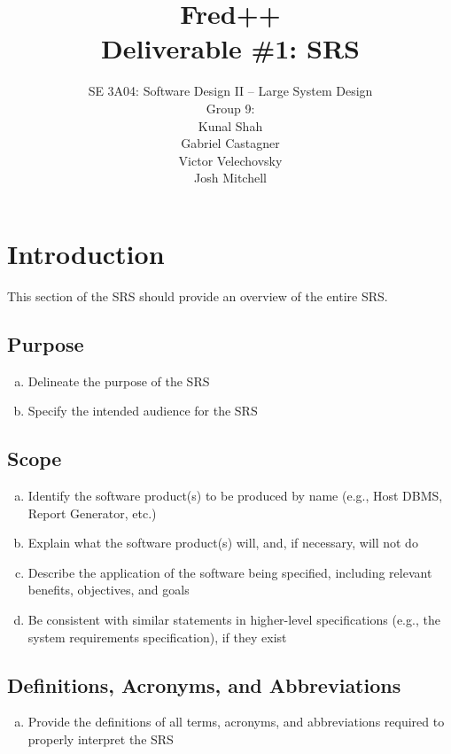 \documentclass[]{article}
\title{Fred++\\Deliverable \#1: SRS}
\author{SE 3A04: Software Design II -- Large System Design\\Group 9:\\Kunal 
Shah\\Gabriel Castagner\\Victor Velechovsky\\Josh Mitchell}
\date{}
\begin{document}
\maketitle	

\section{Introduction}
\label{sec:introduction}

This section of the SRS should provide an overview of the entire SRS.

\subsection{Purpose}
\label{sub:purpose}
\begin{enumerate}[a)]
	\item Delineate the purpose of the SRS
	\item Specify the intended audience for the SRS
\end{enumerate}

\subsection{Scope}
\label{sub:scope}
\begin{enumerate}[a)]
	\item Identify the software product(s) to be produced by name (e.g., Host DBMS, Report Generator, etc.)
	\item Explain what the software product(s) will, and, if necessary, will not do
	\item Describe the application of the software being specified, including relevant benefits, objectives, and goals
	\item Be consistent with similar statements in higher-level specifications (e.g., the system requirements specification), if they exist
\end{enumerate}

\subsection{Definitions, Acronyms, and Abbreviations}
\label{sub:definitions_acronyms_and_abbreviations}
\begin{enumerate}[a)]
	\item Provide the definitions of all terms, acronyms, and abbreviations required to properly interpret the SRS
\end{enumerate}
\end{document}
